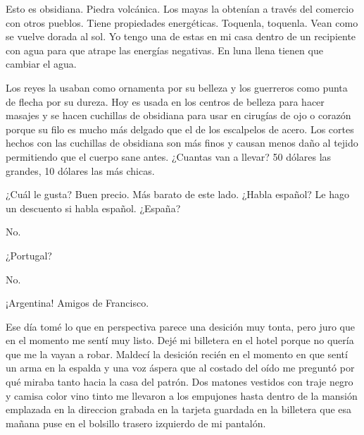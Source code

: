 \documentclass[11pt,twoside,openright,a6paper]{book}
\begin{document}
\vspace{0.5cm}
\hrulefill\hspace{0.2cm} \decofourleft\decofourright \hspace{0.2cm} \hrulefill
\vspace{0.5cm}

Esto es obsidiana. Piedra volcánica. Los mayas la obtenían a través
del comercio con otros pueblos. Tiene propiedades energéticas. Toquenla,
toquenla. Vean como se vuelve dorada al sol. Yo tengo una de estas en
mi casa dentro de un recipiente con agua para que atrape las energías
negativas. En luna llena tienen que cambiar el agua.

Los reyes la usaban como ornamenta por su belleza y los guerreros como punta
de flecha por su dureza. Hoy es usada en los centros de belleza para hacer
masajes y se hacen cuchillas de obsidiana para usar en cirugías de ojo o
corazón porque su filo es mucho más delgado que el de los escalpelos de
acero. Los cortes hechos con las cuchillas de obsidiana son más finos y
causan menos daño al tejido permitiendo que el cuerpo sane antes. ¿Cuantas
van a llevar? 50 dólares las grandes, 10 dólares las más chicas.


\vspace{0.5cm}
\hrulefill\hspace{0.2cm} \decofourleft\decofourright \hspace{0.2cm} \hrulefill
\vspace{0.5cm}

¿Cuál le gusta? Buen precio. Más barato de este lado. ¿Habla español? Le
hago un descuento si habla español. ¿España?

No.

¿Portugal?

No.

¡Argentina! Amigos de Francisco.


\vspace{0.5cm}
\hrulefill\hspace{0.2cm} \decofourleft\decofourright \hspace{0.2cm} \hrulefill
\vspace{0.5cm}

Ese día tomé lo que en perspectiva parece una desición muy tonta, pero
juro que en el momento me sentí muy listo. Dejé mi billetera en el hotel
porque no quería que me la vayan a robar. Maldecí la desición recién
en el momento en que sentí un arma en la espalda y una voz áspera que
al costado del oído me preguntó por qué miraba tanto hacia la casa del
patrón. Dos matones vestidos con traje negro y camisa color vino tinto
me llevaron a los empujones hasta dentro de la mansión emplazada en la
direccion grabada en la tarjeta guardada en la billetera que esa mañana
puse en el bolsillo trasero izquierdo de mi pantalón.
\end{document}
